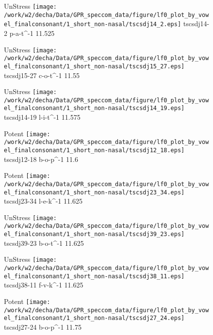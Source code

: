 \documentclass{article}
\begin{document}
\begin{figure}[t]
\begin{minipage}[b]{.24\textwidth}
UnStress
\centering
\texttt{[image: /work/w2/decha/Data/GPR\_speccom\_data/figure/lf0\_plot\_by\_vowel\_finalconsonant/1\_short\_non-nasal/tscsdj14\_2.eps]}
tscsdj14-2 p-a-t\textasciicircum-1 11.525
\end{minipage}
\begin{minipage}[b]{.24\textwidth}
UnStress
\centering
\texttt{[image: /work/w2/decha/Data/GPR\_speccom\_data/figure/lf0\_plot\_by\_vowel\_finalconsonant/1\_short\_non-nasal/tscsdj15\_27.eps]}
tscsdj15-27 c-o-t\textasciicircum-1 11.55
\end{minipage}
\begin{minipage}[b]{.24\textwidth}
UnStress
\centering
\texttt{[image: /work/w2/decha/Data/GPR\_speccom\_data/figure/lf0\_plot\_by\_vowel\_finalconsonant/1\_short\_non-nasal/tscsdj14\_19.eps]}
tscsdj14-19 l-i-t\textasciicircum-1 11.575
\end{minipage}
\begin{minipage}[b]{.24\textwidth}
\colorbox{Apricot}{Potent}
\centering
\texttt{[image: /work/w2/decha/Data/GPR\_speccom\_data/figure/lf0\_plot\_by\_vowel\_finalconsonant/1\_short\_non-nasal/tscsdj12\_18.eps]}
tscsdj12-18 b-o-p\textasciicircum-1 11.6
\end{minipage}
\end{figure}
\clearpage
\begin{figure}[t]
\begin{minipage}[b]{.24\textwidth}
\colorbox{Apricot}{Potent}
\centering
\texttt{[image: /work/w2/decha/Data/GPR\_speccom\_data/figure/lf0\_plot\_by\_vowel\_finalconsonant/1\_short\_non-nasal/tscsdj23\_34.eps]}
tscsdj23-34 l-e-k\textasciicircum-1 11.625
\end{minipage}
\begin{minipage}[b]{.24\textwidth}
UnStress
\centering
\texttt{[image: /work/w2/decha/Data/GPR\_speccom\_data/figure/lf0\_plot\_by\_vowel\_finalconsonant/1\_short\_non-nasal/tscsdj39\_23.eps]}
tscsdj39-23 b-o-t\textasciicircum-1 11.625
\end{minipage}
\begin{minipage}[b]{.24\textwidth}
UnStress
\centering
\texttt{[image: /work/w2/decha/Data/GPR\_speccom\_data/figure/lf0\_plot\_by\_vowel\_finalconsonant/1\_short\_non-nasal/tscsdj38\_11.eps]}
tscsdj38-11 f-v-k\textasciicircum-1 11.625
\end{minipage}
\begin{minipage}[b]{.24\textwidth}
\colorbox{Apricot}{Potent}
\centering
\texttt{[image: /work/w2/decha/Data/GPR\_speccom\_data/figure/lf0\_plot\_by\_vowel\_finalconsonant/1\_short\_non-nasal/tscsdj27\_24.eps]}
tscsdj27-24 b-o-p\textasciicircum-1 11.75
\end{minipage}
\end{figure}
\end{document}

